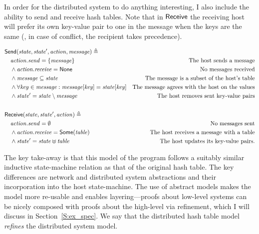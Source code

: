 In order for the distributed system to do anything interesting, I also include
the ability to send and receive hash tables. Note that in \(\mathsf{Receive}\) the
receiving host will prefer its own key-value pair to one in the message when the
keys are the same (\ie, in case of conflict, the recipient takes precedence).

\begin{align*}
    & \mathsf{Send}(\mathit{state}, \mathit{state'}, \mathit{action}, \mathit{message}) \triangleq\; \\
    & \quad \mathit{action.send} = \left\{\mathit{message}\right\}  & \text{The host sends a message} \\
    & \quad \land \mathit{action.receive} = \mathsf{None} & \text{No messages received} \\
    & \quad \land \mathit{message} \subseteq \mathit{state} & \text{The message is a subset of the host's table} \\
    & \quad \land \forall \mathit{key} \in \mathit{message} : \mathit{message}[\mathit{key}] = \mathit{state}[\mathit{key}]
        & \text{The message agrees with the host on the values} \\
    & \quad \land \mathit{state'} = \mathit{state} \setminus \mathit{message}
        & \text{The host removes sent key-value pairs}\\
    \\
    & \mathsf{Receive}(\mathit{state}, \mathit{state'}, \mathit{action}) \triangleq\; \\
    & \quad \mathit{action.send} = \emptyset & \text{No messages sent} \\
    & \quad \land \mathit{action.receive} = \mathsf{Some}(\mathit{table})
        & \text{The host receives a message with a table} \\
    & \quad \land \mathit{state'} = \mathit{state} \uplus \mathit{table}
        & \text{The host updates its key-value pairs.}
\end{align*}

The key take-away is that this model of the program follows a suitably similar
inductive state-machine relation as that of the original hash table. The key
differences are network and distributed system abstractions and their
incorporation into the host state-machine. The use of abstract models makes the
model more re-usable and enables layering---proofs about low-level systems can be
nicely composed with proofs about the high-level via refinement, which I will
discuss in Section~\ref{S:ex_spec}. We say that the distributed hash table
model \emph{refines} the distributed system model.

